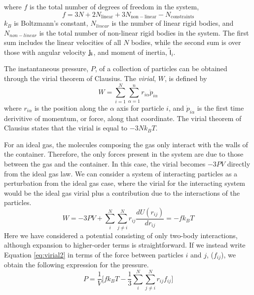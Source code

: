 where $f$ is the total number of degrees of freedom in the system,
\begin{equation}
f = 3 N + 2 N_{\mathrm{linear}} + 3 N_{\mathrm{non-linear}} - N_{\mathrm{constraints}}
\end{equation}
$k_B$ is Boltzmann's constant, $N_{linear}$ is the number of linear
rigid bodies, and $N_{non-linear}$ is the total number of non-linear
rigid bodies in the system. The first sum includes the linear velocities
of all $N$ bodies, while the second sum is over those with angular
velocity $\bf j_i$, and moment of inertia,
$\overleftrightarrow{\mathsf{I}}_i$.

The instantaneous pressure, $P$, of a collection of particles can be
obtained through the virial theorem of Clausius. The \textit{virial},
$W$, is defined by
\begin{equation}\label{eq:virial}
W = \sum_{i=1}^N \sum_{\alpha=1}^n r_{i\alpha}\dot{p}_{i\alpha}
\end{equation}
where $r_{i\alpha}$ is the position along the $\alpha$ axis for
particle $i$, and
$\dot{p}_{i\alpha}$ is the first time derivitive of momentum, or force,
along that coordinate. The virial theorem of Clausius states that the
virial is equal to $-3Nk_BT$.

For an ideal gas, the molecules composing the gas only interact with
the walls of the container. Therefore, the only forces present in the
system are due to those between the gas and the container. In this
case, the virial becomes $-3PV$ directly from the ideal gas law. We
can consider a system of interacting particles as a perturbation from
the ideal gas case, where the virial for the interacting system would
be the ideal gas virial plus a contribution due to the interactions of
the particles.
\begin{equation}\label{eq:virial2}
W = -3PV + \sum_i^N \sum_{j\neq i}^N r_{ij} \frac{dU(r_{ij})}{dr_{ij}} = -fk_BT
\end{equation}
Here we have considered a potential consisting of only two-body
interactions, although expansion to higher-order terms is
straightforward. If we instead write Equation \eqref{eq:virial2} in terms
of the force between particles $i$ and $j$, ($f_{ij}$), we obtain the
following expression for the pressure.
\begin{equation}\label{eq:virial3}
P = \frac{1}{V}\Big[fk_BT - \frac{1}{3} \sum_i^N \sum_{j\neq i}^N
r_{ij} f_{ij}\Big]
\end{equation}

